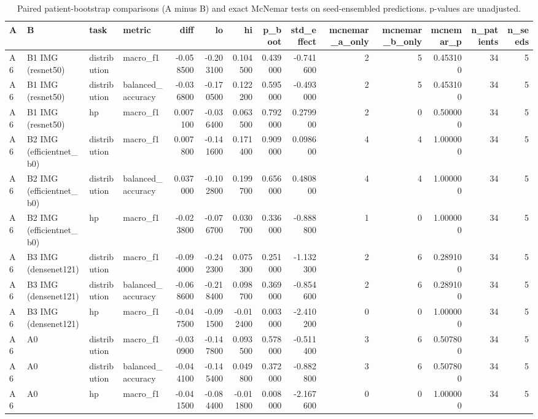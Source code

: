 \begin{table}
\caption{Paired patient-bootstrap comparisons (A minus B) and exact McNemar tests on seed-ensembled predictions. p-values are unadjusted.}
\label{tab:table7b_comparisons}
\begin{tabular}{llllrrrrrrrrrr}
\toprule
A & B & task & metric & diff & lo & hi & p\_boot & std\_effect & mcnemar\_a\_only & mcnemar\_b\_only & mcnemar\_p & n\_patients & n\_seeds \\
\midrule
A6 & B1 IMG (resnet50) & distribution & macro\_f1 & -0.058500 & -0.203100 & 0.104500 & 0.439000 & -0.741600 & 2 & 5 & 0.453100 & 34 & 5 \\
A6 & B1 IMG (resnet50) & distribution & balanced\_accuracy & -0.036800 & -0.170500 & 0.122200 & 0.595000 & -0.493000 & 2 & 5 & 0.453100 & 34 & 5 \\
A6 & B1 IMG (resnet50) & hp & macro\_f1 & 0.007100 & -0.036400 & 0.063500 & 0.792000 & 0.279900 & 2 & 0 & 0.500000 & 34 & 5 \\
A6 & B2 IMG (efficientnet\_b0) & distribution & macro\_f1 & 0.007800 & -0.141600 & 0.171400 & 0.909000 & 0.098600 & 4 & 4 & 1.000000 & 34 & 5 \\
A6 & B2 IMG (efficientnet\_b0) & distribution & balanced\_accuracy & 0.037000 & -0.102800 & 0.199700 & 0.656000 & 0.480800 & 4 & 4 & 1.000000 & 34 & 5 \\
A6 & B2 IMG (efficientnet\_b0) & hp & macro\_f1 & -0.023800 & -0.076700 & 0.030700 & 0.336000 & -0.888800 & 1 & 0 & 1.000000 & 34 & 5 \\
A6 & B3 IMG (densenet121) & distribution & macro\_f1 & -0.094000 & -0.242300 & 0.075300 & 0.251000 & -1.132300 & 2 & 6 & 0.289100 & 34 & 5 \\
A6 & B3 IMG (densenet121) & distribution & balanced\_accuracy & -0.068600 & -0.218400 & 0.098700 & 0.369000 & -0.854600 & 2 & 6 & 0.289100 & 34 & 5 \\
A6 & B3 IMG (densenet121) & hp & macro\_f1 & -0.047500 & -0.091500 & -0.012400 & 0.003000 & -2.410200 & 0 & 0 & 1.000000 & 34 & 5 \\
A6 & A0 & distribution & macro\_f1 & -0.030900 & -0.147800 & 0.093500 & 0.578000 & -0.511400 & 3 & 6 & 0.507800 & 34 & 5 \\
A6 & A0 & distribution & balanced\_accuracy & -0.044100 & -0.145400 & 0.049800 & 0.372000 & -0.882800 & 3 & 6 & 0.507800 & 34 & 5 \\
A6 & A0 & hp & macro\_f1 & -0.041500 & -0.084400 & -0.011800 & 0.008000 & -2.167600 & 0 & 0 & 1.000000 & 34 & 5 \\

\end{tabular}
\end{table}
